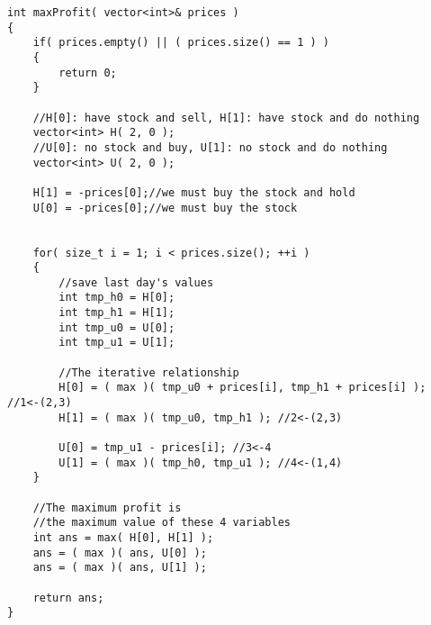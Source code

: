 \begin{lstlisting}[style=customc, caption={Dynamic Programming}]
int maxProfit( vector<int>& prices )
{
    if( prices.empty() || ( prices.size() == 1 ) )
    {
        return 0;
    }

    //H[0]: have stock and sell, H[1]: have stock and do nothing
    vector<int> H( 2, 0 );
    //U[0]: no stock and buy, U[1]: no stock and do nothing
    vector<int> U( 2, 0 );

    H[1] = -prices[0];//we must buy the stock and hold
    U[0] = -prices[0];//we must buy the stock


    for( size_t i = 1; i < prices.size(); ++i )
    {
        //save last day's values
        int tmp_h0 = H[0];
        int tmp_h1 = H[1];
        int tmp_u0 = U[0];
        int tmp_u1 = U[1];

        //The iterative relationship
        H[0] = ( max )( tmp_u0 + prices[i], tmp_h1 + prices[i] ); //1<-(2,3)
        H[1] = ( max )( tmp_u0, tmp_h1 ); //2<-(2,3)

        U[0] = tmp_u1 - prices[i]; //3<-4
        U[1] = ( max )( tmp_h0, tmp_u1 ); //4<-(1,4)
    }

    //The maximum profit is
    //the maximum value of these 4 variables
    int ans = max( H[0], H[1] );
    ans = ( max )( ans, U[0] );
    ans = ( max )( ans, U[1] );

    return ans;
}
\end{lstlisting}

